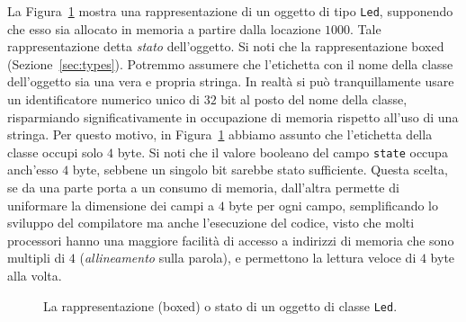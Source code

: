 La Figura~\ref{fig:object} mostra una rappresentazione di un oggetto di
tipo \texttt{Led}, supponendo che esso sia allocato in memoria a partire
dalla locazione $1000$. Tale rappresentazione \e detta
\emph{stato} dell'oggetto. Si noti che la rappresentazione \e boxed
(Sezione~\ref{sec:types}). Potremmo assumere che l'etichetta
con il nome della classe dell'oggetto sia una vera e propria stringa.
In realt\`a si pu\`o tranquillamente usare un identificatore numerico unico
di $32$ bit
al posto del nome della classe, risparmiando significativamente in occupazione
di memoria rispetto all'uso di una stringa. Per questo
motivo, in Figura~\ref{fig:object}
abbiamo assunto che l'etichetta della classe occupi solo $4$ byte.
Si noti che il valore booleano del campo \texttt{state} occupa anch'esso
$4$ byte, sebbene un singolo bit sarebbe stato sufficiente. Questa
scelta, se da una parte porta a un consumo di memoria, dall'altra permette
di uniformare la dimensione dei campi a $4$ byte per ogni campo, semplificando
lo sviluppo del compilatore ma anche l'esecuzione del codice, visto che
molti processori hanno una maggiore facilit\`a di accesso a indirizzi
di memoria che sono multipli di $4$ (\emph{allineamento} sulla parola),
e permettono la lettura veloce di $4$ byte alla volta.
%
\begin{figure}
\begin{center}
\end{center}
\caption{La rappresentazione (boxed) o stato di un oggetto di classe \texttt{Led}.}
  \label{fig:object}
\end{figure}

